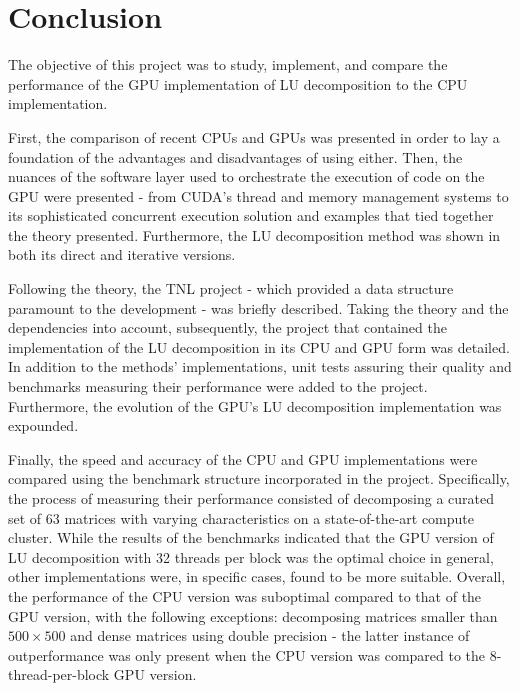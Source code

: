 \chapter*{Conclusion}				   	   %

The objective of this project was to study, implement, and compare the performance of the GPU implementation of LU decomposition to the CPU implementation.
\par First, the comparison of recent CPUs and GPUs was presented in order to lay a foundation of the advantages and disadvantages of using either. Then, the nuances of the software layer used to orchestrate the execution of code on the GPU were presented - from CUDA's thread and memory management systems to its sophisticated concurrent execution solution and examples that tied together the theory presented. Furthermore, the LU decomposition method was shown in both its direct and iterative versions.
\par Following the theory, the TNL project - which provided a data structure paramount to the development - was briefly described. Taking the theory and the dependencies into account, subsequently, the project that contained the implementation of the LU decomposition in its CPU and GPU form was detailed. In addition to the methods' implementations, unit tests assuring their quality and benchmarks measuring their performance were added to the project. Furthermore, the evolution of the GPU's LU decomposition implementation was expounded.
\par Finally, the speed and accuracy of the CPU and GPU implementations were compared using the benchmark structure incorporated in the project. Specifically, the process of measuring their performance consisted of decomposing a curated set of 63 matrices with varying characteristics on a state-of-the-art compute cluster. While the results of the benchmarks indicated that the GPU version of LU decomposition with 32 threads per block was the optimal choice in general, other implementations were, in specific cases, found to be more suitable. Overall, the performance of the CPU version was suboptimal compared to that of the GPU version, with the following exceptions: decomposing matrices smaller than $ 500\times 500 $ and dense matrices using double precision - the latter instance of outperformance was only present when the CPU version was compared to the 8-thread-per-block GPU version.
